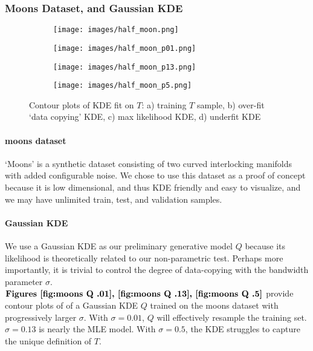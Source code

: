 \subsubsection{Moons Dataset, and Gaussian KDE}
\label{sec:appendix moons kDE}
\begin{figure*}[h]
    \centering
    \begin{subfigure}{.245\linewidth}
        \centering
        \texttt{[image: images/half\_moon.png]}
        \caption{}\label{fig:moons T}
    \end{subfigure}
        \hfill
    \begin{subfigure}{.245\linewidth}
        \centering
        \texttt{[image: images/half\_moon\_p01.png]}
        \caption{}\label{fig:moons Q .01}
    \end{subfigure}
        \hfill
    \begin{subfigure}{.245\linewidth}
        \centering
        \texttt{[image: images/half\_moon\_p13.png]}
        \caption{}\label{fig:moons Q .13}
    \end{subfigure}
       \hfill
    \begin{subfigure}{.245\linewidth}
        \centering
        \texttt{[image: images/half\_moon\_p5.png]}
        \caption{}\label{fig:moons Q .5}
    \end{subfigure}
    \caption{Contour plots of KDE fit on $T$: a) training $T$ sample, b) over-fit `data copying' KDE, c) max likelihood KDE, d) underfit KDE}
    \label{fig:half moon}
\end{figure*} 

\paragraph{moons dataset}
`Moons' is a synthetic dataset consisting of two curved interlocking manifolds with added configurable noise. We chose to use this dataset as a proof of concept because it is low dimensional, and thus KDE friendly and easy to visualize, and we may have unlimited train, test, and validation samples. 

\paragraph{Gaussian KDE}
We use a Gaussian KDE as our preliminary generative model $Q$ because its likelihood is theoretically related to our non-parametric test. Perhaps more importantly, it is trivial to control the degree of data-copying with the bandwidth parameter $\sigma$. $\textbf{Figures \ref{fig:moons Q .01}, \ref{fig:moons Q .13}, \ref{fig:moons Q .5}}$ provide contour plots of of a Gaussian KDE $Q$ trained on the moons dataset with progressively larger $\sigma$. With $\sigma = 0.01$, $Q$ will effectively resample the training set. $\sigma = 0.13$ is nearly the MLE model. With $\sigma = 0.5$, the KDE struggles to capture the unique definition of $T$. 

